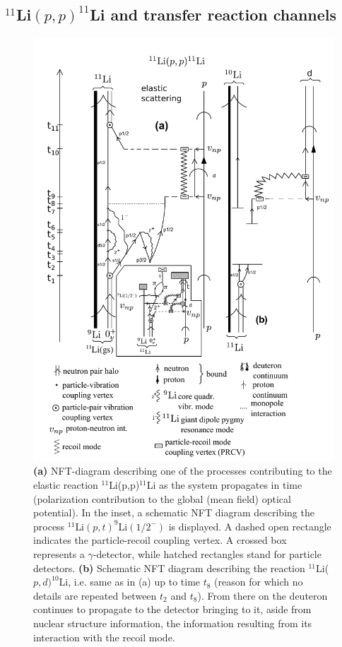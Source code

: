 \subsection{$^{11}$Li$(p,p)^{11}$Li and transfer reaction channels}
     \begin{figure}
     \centerline {
     \includegraphics*[width=12cm]{introduccion/figs/fig1_9_2xx}
     }
     \caption{{\bf (a)}  NFT-diagram describing  one of the processes contributing to the elastic reaction $^{11}$Li(p,p)$^{11}$Li as the system propagates in time
         	    	(polarization contribution to the global  (mean field) optical potential).  In the inset, a schematic NFT diagram describing the process $^{11}$Li$(p,t)^{9}$Li$(1/2^-)$ is displayed. A dashed open rectangle indicates the particle-recoil coupling vertex. A crossed box represents a $\gamma$-detector, while hatched rectangles stand for particle detectors. 
         	    	 {\bf (b)} Schematic NFT diagram describing the reaction $^{11}$Li($p,d)^{10}$Li, i.e. same as in (a)  up to time $t_8$ (reason for which no  details are repeated between $t_2$ and $t_8$). From there on  the deuteron continues  to propagate  to the detector bringing to it, aside from nuclear structure information, the information resulting from its interaction with the recoil mode.}
     \label{fig1.9.2}
     \end{figure}
